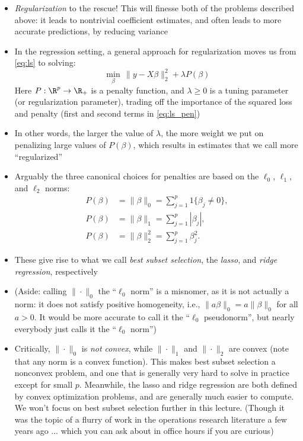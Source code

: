 \documentclass{article}
\begin{document}
\begin{itemize}
\item \emph{Regularization} to the rescue! This will finesse both of the
  problems described above: it leads to nontrivial coefficient estimates, and
  often leads to more accurate predictions, by reducing variance  

\item In the regression setting, a general approach for regularization moves us 
  from \eqref{eq:ls} to solving:
  \begin{equation}
  \label{eq:ls_pen}
  \min_\beta \, \|y - X\beta\|_2^2 + \lambda P(\beta)
  \end{equation}
  Here $P : \R^p \to \R_+$ is a penalty function, and $\lambda \geq 0$ is a
  tuning parameter (or regularization parameter), trading off the importance
  of the squared loss and penalty (first and second terms in \eqref{eq:ls_pen}) 

\item In other words, the larger the value of $\lambda$, the more weight we put
  on penalizing large values of $P(\beta)$, which results in estimates that we
  call more ``regularized''   

\item Arguably the three canonical choices for penalties are based on the
  $\ell_0$, $\ell_1$, and $\ell_2$ norms:   
  \begin{align*}
  P(\beta) &= \|\beta\|_0 = \sum_{j=1}^p 1\{\beta_j \not= 0\}, \\
  P(\beta) &= \|\beta\|_1 = \sum_{j=1}^p |\beta_j|, \\
  P(\beta) &= \|\beta\|_2^2 = \sum_{j=1}^p \beta_j^2.
  \end{align*}

\item These give rise to what we call \emph{best subset selection}, the
  \emph{lasso}, and \emph{ridge regression}, respectively  

\item (Aside: calling $\|\cdot\|_0$ the ``$\ell_0$ norm'' is a misnomer, as it
  is not actually a norm: it does not satisfy positive homogeneity, i.e.,
  $\|a\beta\|_0 = a\|\beta\|_0$ for all $a>0$. It would be more accurate to
  call it the ``$\ell_0$ pseudonorm'', but nearly everybody just calls it the
  ``$\ell_0$ norm'')

\item Critically, $\|\cdot\|_0$ is \emph{not convex}, while $\|\cdot\|_1$ and 
  $\|\cdot\|_2$ are convex (note that any norm is a convex function). This makes
  best subset selection a nonconvex problem, and one that is generally very hard
  to solve in practice except for small $p$. Meanwhile, the lasso and ridge
  regression are both defined by convex optimization problems, and are generally
  much easier to compute. We won't focus on best subset selection further in
  this lecture. (Though it was the topic of a flurry of work in the operations
  research literature a few years ago ... which you can ask about in office
  hours if you are curious)   


\end{itemize}
\end{document}
